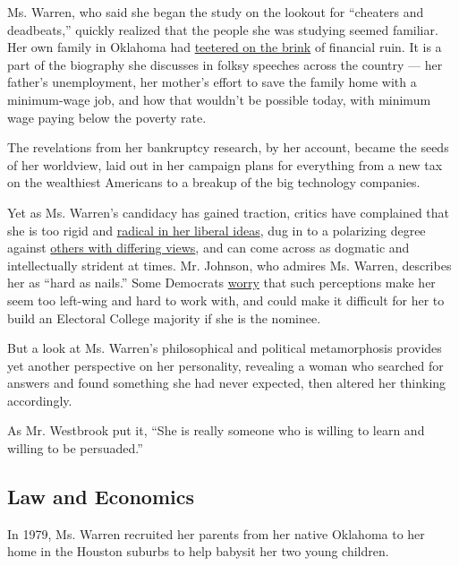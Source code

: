 Ms. Warren, who said she began the study on the lookout for ``cheaters
and deadbeats,'' quickly realized that the people she was studying
seemed familiar. Her own family in Oklahoma had
\href{https://www.nytimes.com/2019/06/24/us/politics/elizabeth-warren-republican-conservative-democrat.html}{teetered
on the brink} of financial ruin. It is a part of the biography she
discusses in folksy speeches across the country --- her father's
unemployment, her mother's effort to save the family home with a
minimum-wage job, and how that wouldn't be possible today, with minimum
wage paying below the poverty rate.

The revelations from her bankruptcy research, by her account, became the
seeds of her worldview, laid out in her campaign plans for everything
from a new tax on the wealthiest Americans to a breakup of the big
technology companies.

Yet as Ms. Warren's candidacy has gained traction, critics have
complained that she is too rigid and
\href{https://www.nytimes.com/2019/07/30/us/politics/democratic-presidential-debate-recap.html}{radical
in her liberal ideas}, dug in to a polarizing degree against
\href{https://dealbook.nytimes.com/2013/02/14/at-senate-hearing-warren-comes-out-swinging/}{others
with differing views}, and can come across as dogmatic and
intellectually strident at times. Mr. Johnson, who admires Ms. Warren,
describes her as ``hard as nails.'' Some Democrats
\href{https://www.nytimes.com/2019/08/15/us/politics/elizabeth-warren-2020-campaign.html}{worry}
that such perceptions make her seem too left-wing and hard to work with,
and could make it difficult for her to build an Electoral College
majority if she is the nominee.

But a look at Ms. Warren's philosophical and political metamorphosis
provides yet another perspective on her personality, revealing a woman
who searched for answers and found something she had never expected,
then altered her thinking accordingly.

As Mr. Westbrook put it, ``She is really someone who is willing to learn
and willing to be persuaded.''

\hypertarget{law-and-economics}{%
\subsection{Law and Economics}\label{law-and-economics}}

In 1979, Ms. Warren recruited her parents from her native Oklahoma to
her home in the Houston suburbs to help babysit her two young children.

